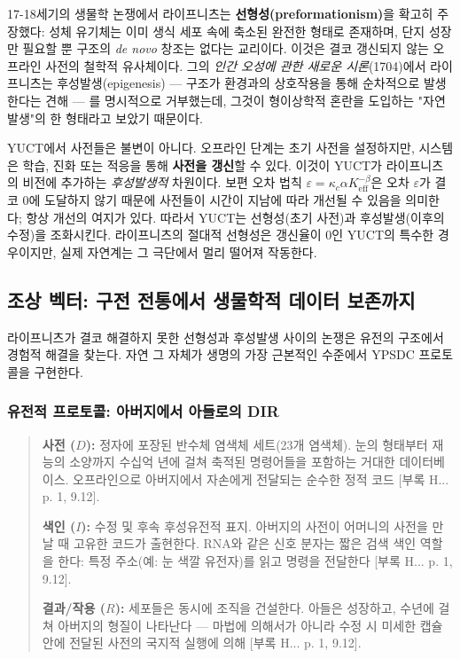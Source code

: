 \documentclass[12pt,a4paper]{article}
\begin{document}
	17-18세기의 생물학 논쟁에서 라이프니츠는 \textbf{선형성(preformationism)}을 확고히 주장했다: 성체 유기체는 이미 생식 세포 속에 축소된 완전한 형태로 존재하며, 단지 성장만 필요할 뿐 구조의 \emph{de novo} 창조는 없다는 교리이다. 이것은 결코 갱신되지 않는 오프라인 사전의 철학적 유사체이다. 그의 \emph{인간 오성에 관한 새로운 시론}(1704)에서 라이프니츠는 후성발생(epigenesis) — 구조가 환경과의 상호작용을 통해 순차적으로 발생한다는 견해 — 를 명시적으로 거부했는데, 그것이 형이상학적 혼란을 도입하는 "자연발생"의 한 형태라고 보았기 때문이다.
	
	YUCT에서 사전들은 불변이 아니다. 오프라인 단계는 초기 사전을 설정하지만, 시스템은 학습, 진화 또는 적응을 통해 \textbf{사전을 갱신}할 수 있다. 이것이 YUCT가 라이프니츠의 비전에 추가하는 \emph{후성발생적} 차원이다. 보편 오차 법칙 \(\varepsilon = \kappa_c \alpha K_{\mathrm{eff}}^{-\beta}\)은 오차 \(\varepsilon\)가 결코 0에 도달하지 않기 때문에 사전들이 시간이 지남에 따라 개선될 수 있음을 의미한다; 항상 개선의 여지가 있다. 따라서 YUCT는 선형성(초기 사전)과 후성발생(이후의 수정)을 조화시킨다. 라이프니츠의 절대적 선형성은 갱신율이 0인 YUCT의 특수한 경우이지만, 실제 자연계는 그 극단에서 멀리 떨어져 작동한다.
	
	\subsection{조상 벡터: 구전 전통에서 생물학적 데이터 보존까지}
	\label{subsec:ancestral-vector}
	
	라이프니츠가 결코 해결하지 못한 선형성과 후성발생 사이의 논쟁은 유전의 구조에서 경험적 해결을 찾는다. 자연 그 자체가 생명의 가장 근본적인 수준에서 YPSDC 프로토콜을 구현한다.
	
	\subsubsection{유전적 프로토콜: 아버지에서 아들로의 DIR}
	
	\begin{quote}
		\textbf{사전 ($D$):} 정자에 포장된 반수체 염색체 세트(23개 염색체). 눈의 형태부터 재능의 소양까지 수십억 년에 걸쳐 축적된 명령어들을 포함하는 거대한 데이터베이스. 오프라인으로 아버지에서 자손에게 전달되는 순수한 정적 코드 [부록 H... p. 1, 9.12].
		
		\textbf{색인 ($I$):} 수정 및 후속 후성유전적 표지. 아버지의 사전이 어머니의 사전을 만날 때 고유한 코드가 출현한다. RNA와 같은 신호 분자는 짧은 검색 색인 역할을 한다: 특정 주소(예: 눈 색깔 유전자)를 읽고 명령을 전달한다 [부록 H... p. 1, 9.12].
		
		\textbf{결과/작용 ($R$):} 세포들은 동시에 조직을 건설한다. 아들은 성장하고, 수년에 걸쳐 아버지의 형질이 나타난다 — 마법에 의해서가 아니라 수정 시 미세한 캡슐 안에 전달된 사전의 국지적 실행에 의해 [부록 H... p. 1, 9.12].
	\end{quote}
	
\end{document}
